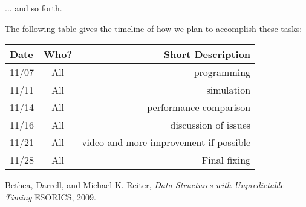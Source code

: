 \documentclass[11pt,twocolumn]{article}
\begin{document}
... and so forth.

The following table gives the timeline of how we plan to accomplish these tasks:

\begin{table}[h!]
\centering
\begin{tabular}{ |l | c | r|}
  \hline
  Date & Who? & Short Description \\
  \hline
  \hline
  11/07 & All & programming \\
  \hline
  11/11 & All & simulation \\
  
  \hline
  11/14 & All & performance comparison \\
  
  \hline
  11/16 & All & discussion of issues \\
  
  \hline
  11/21 & All & video and more improvement if possible \\
  
 
  \hline
  11/28 & All & Final fixing \\
  \hline
\end{tabular}
\end{table}

\pagebreak

\begin{thebibliography}{9}
	
	Bethea, Darrell, and Michael K. Reiter,
	\emph{Data Structures with Unpredictable Timing}
	ESORICS,
	2009.
	
\end{thebibliography}
\end{document}
